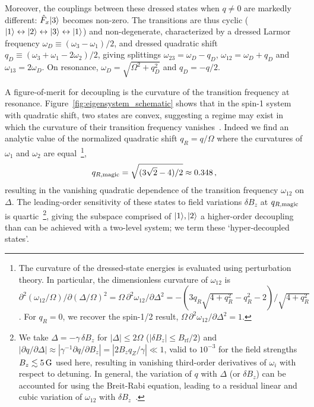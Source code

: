 \documentclass[aps,prl,reprint,superscriptaddress,floatfix]{revtex4-1}
\begin{document}
Moreover, the couplings between these dressed states when $q \neq 0$ are markedly different:
$\hat{F}_x \vert 3 \rangle $ becomes non-zero.
The transitions are thus cyclic ($\vert 1 \rangle  \leftrightarrow \vert 2 \rangle  \leftrightarrow \vert 3 \rangle  \leftrightarrow \vert 1 \rangle $) and non-degenerate, characterized by a dressed Larmor frequency $\omega_D\equiv(\omega_3-\omega_1)/2$, and dressed quadratic shift $q_D \equiv (\omega_3 + \omega_1 -2\omega_2)/2$, giving splittings $\omega_{23}=\omega_D-q_D$, $\omega_{12}=\omega_D+q_D$ and $\omega_{13}=2\omega_D$.
On resonance, $\omega_D=\sqrt{\Omega^2+q_D^2}$ and $q_D = -q/2$.

A figure-of-merit for decoupling is the curvature of the transition frequency at resonance.
Figure~\ref{fig:eigensystem_schematic} shows that in the spin-1 system with quadratic shift, two states are convex, suggesting a regime may exist in which the curvature of their transition frequency vanishes~\cite{rabl_strong_2009,*xu_coherence-protected_2012}.
Indeed we find an analytic value of the normalized quadratic shift $q_R=q/\Omega$ where the curvatures of $\omega_1$ and $\omega_2$ are equal~\footnote{
  The curvature of the dressed-state energies is evaluated using perturbation theory. In particular, the dimensionless curvature of $\omega_{12}$ is $\partial^2(\omega_{12}/\Omega)/\partial(\Delta/\Omega)^2 = \Omega \, \partial^2\omega_{12}/\partial \Delta^2 = -(3 q_R \sqrt{4 + q_R^2} - q_R^2 - 2)/\sqrt{4 + q_R^2}$. For $q_R = 0$, we recover the spin-1/2 result, $\Omega\, \partial^2\omega_{12}/\partial \Delta^2 = 1$.},
\begin{align}
\label{eq:qRmagic}
    q_{R,\text{magic}} = \sqrt{(3\sqrt{2} - 4)/2} \approx 0.348 \, ,
\end{align}
resulting in the vanishing quadratic dependence of the transition frequency $\omega_{12}$ on $\Delta$.
The leading-order sensitivity of these states to field variations $\delta B_z$ at $q_{R,\text{magic}}$ is quartic~\footnote{
    We take $\Delta = -\gamma \, \delta B_z$ for $|\Delta | \leq 2\Omega$ ($| \delta B_z | \leq B_{\text{rf}}/2$) and $| \partial q / \partial \Delta | \approx | \gamma^{-1} \partial q / \partial B_z | = |2 B_z q_Z / \gamma| \ll 1$, valid to $10^{-3}$ for the field strengths $B_z \lesssim \unit[5]{G}$ used here, resulting in vanishing third-order derivatives of $\omega_i$ with respect to detuning. 
    In general, the variation of $q$ with $\Delta$ (or $\delta B_z$) can be accounted for using the Breit-Rabi equation, leading to a residual linear and cubic variation of $\omega_{12}$ with $\delta B_z$~\cite{trypogeorgos_synthetic_2017}.},
giving the subspace comprised of ${\vert 1 \rangle ,\vert 2 \rangle }$ a higher-order decoupling than can be achieved with a two-level system; we term these `hyper-decoupled states'.
\end{document}
